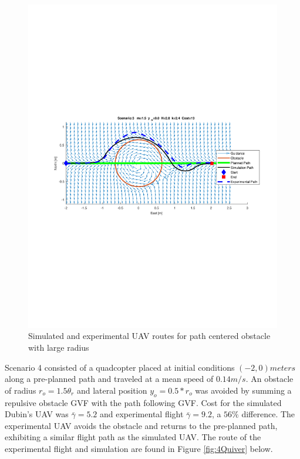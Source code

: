 \documentclass[numbered,pdftex]{ohio-etd}
\begin{document}
\begin{figure}[H]
	\centering
	\includegraphics[trim = 50 300 0 285, clip, width=16.5cm]{Figures/results/compareFigures/3Quiver}
	\caption{Simulated and experimental UAV routes for path centered obstacle with large radius}
	\label{fig:3Quiver}
\end{figure}

Scenario 4 consisted of a quadcopter placed at initial conditions $(-2,0) meters$ along a pre-planned path and traveled at a mean speed of $0.14 m/s$. An obstacle of radius $r_o = 1.5 \theta_r$ and lateral position $y_o=0.5*r_o$ was avoided by summing a repulsive obstacle GVF with the path following GVF. Cost for the simulated Dubin's UAV was $\bar{\gamma} = 5.2$ and experimental flight $\bar{\gamma} = 9.2$, a $56 \%$ difference. The experimental UAV avoids the obstacle and returns to the pre-planned path, exhibiting a similar flight path as the simulated UAV. The route of the experimental flight and simulation are found in Figure \ref{fig:4Quiver} below. 
\end{document}
